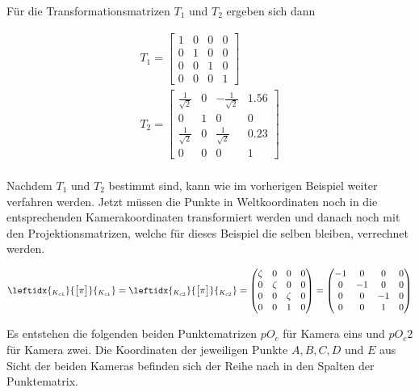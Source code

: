Für die Transformationsmatrizen $T_1$ und $T_2$ ergeben sich dann 

\begin{gather}
	T_1 = 
	\begin{bmatrix}
	1&0&0&0\\
	0&1&0&0\\
	0&0&1&0\\
	0&0&0&1
	\end{bmatrix}\\	
	T_2=
	 \begin{bmatrix}
	\frac{1}{\sqrt{2}}&0&-\frac{1}{\sqrt{2}}&1.56\\
	0&1&0&0\\
	\frac{1}{\sqrt{2}}&0&\frac{1}{\sqrt{2}}&0.23\\
	0&0&0&1
	\end{bmatrix}
\end{gather}\\

Nachdem $T_1$ und $T_2$ bestimmt sind, kann wie im vorherigen Beispiel weiter verfahren werden. Jetzt müssen die Punkte in Weltkoordinaten noch in die entsprechenden Kamerakoordinaten transformiert werden und danach noch mit den Projektionsmatrizen, welche für dieses Beispiel die selben bleiben, verrechnet werden.

 \begin{gather}
 \leftidx{_{K_{c1}}}{\begin{bmatrix}
 	\pi
 	\end{bmatrix}}{_{K_{c1}}}
 =		\leftidx{_{K_{c2}}}{\begin{bmatrix}
 	\pi
 	\end{bmatrix}}{_{K_{c2}}}
 =
 \begin{pmatrix}
 \zeta&0&0&0\\
 0&\zeta&0&0\\
 0&0&\zeta&0\\
 0&0&1&0
 \end{pmatrix}=
 \begin{pmatrix}
 -1&0&0&0\\
 0&-1&0&0\\
 0&0&-1&0\\
 0&0&1&0
 \end{pmatrix}
 \end{gather}
 
 Es entstehen die folgenden beiden Punktematrizen $pO_c$ für Kamera eins und $pO_c2$ für Kamera zwei. Die Koordinaten der jeweiligen Punkte $A,B,C,D$ und $E$ aus Sicht der beiden Kameras befinden sich der Reihe nach in den Spalten der Punktematrix. 
 
